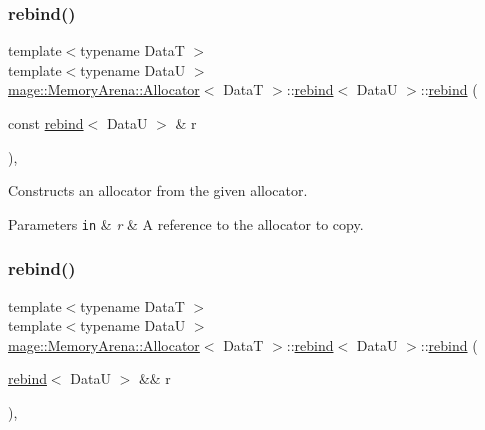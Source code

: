 \subsubsection{\texorpdfstring{rebind()}{rebind()}\hspace{0.1cm}{\footnotesize\ttfamily [2/3]}}
{\footnotesize\ttfamily template$<$typename DataT $>$ \\
template$<$typename DataU $>$ \\
\hyperlink{structmage_1_1_memory_arena_1_1_allocator}{mage\+::\+Memory\+Arena\+::\+Allocator}$<$ DataT $>$\+::\hyperlink{structmage_1_1_memory_arena_1_1_allocator_1_1rebind}{rebind}$<$ DataU $>$\+::\hyperlink{structmage_1_1_memory_arena_1_1_allocator_1_1rebind}{rebind} (\begin{DoxyParamCaption}\item[{const \hyperlink{structmage_1_1_memory_arena_1_1_allocator_1_1rebind}{rebind}$<$ DataU $>$ \&}]{r }\end{DoxyParamCaption})\hspace{0.3cm}{\ttfamily [private]}, {\ttfamily [delete]}}

Constructs an allocator from the given allocator.


\begin{DoxyParams}[1]{Parameters}
\mbox{\tt in}  & {\em r} & A reference to the allocator to copy. \\
\hline
\end{DoxyParams}
\hypertarget{structmage_1_1_memory_arena_1_1_allocator_1_1rebind_ad5ffaeaa7cb232ecab88501d9913f9b7}{}\label{structmage_1_1_memory_arena_1_1_allocator_1_1rebind_ad5ffaeaa7cb232ecab88501d9913f9b7} 
\subsubsection{\texorpdfstring{rebind()}{rebind()}\hspace{0.1cm}{\footnotesize\ttfamily [3/3]}}
{\footnotesize\ttfamily template$<$typename DataT $>$ \\
template$<$typename DataU $>$ \\
\hyperlink{structmage_1_1_memory_arena_1_1_allocator}{mage\+::\+Memory\+Arena\+::\+Allocator}$<$ DataT $>$\+::\hyperlink{structmage_1_1_memory_arena_1_1_allocator_1_1rebind}{rebind}$<$ DataU $>$\+::\hyperlink{structmage_1_1_memory_arena_1_1_allocator_1_1rebind}{rebind} (\begin{DoxyParamCaption}\item[{\hyperlink{structmage_1_1_memory_arena_1_1_allocator_1_1rebind}{rebind}$<$ DataU $>$ \&\&}]{r }\end{DoxyParamCaption})\hspace{0.3cm}{\ttfamily [private]}, {\ttfamily [delete]}}

